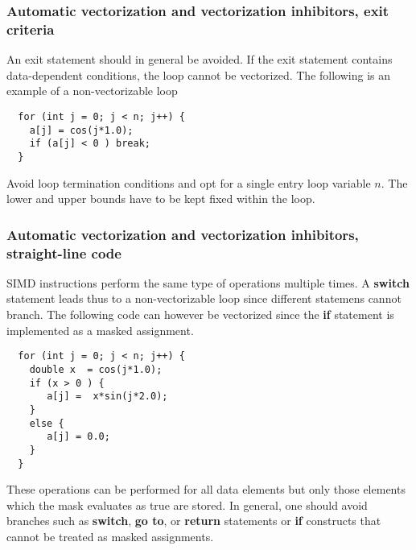 \documentclass{beamer}
\begin{document}
\begin{frame}
\frametitle{Automatic vectorization and vectorization inhibitors, exit criteria}

An exit statement should in general be avoided. 
If the exit statement contains data-dependent conditions, the loop cannot be vectorized. 
The following is an example of a non-vectorizable loop





\begin{verbatim}
  for (int j = 0; j < n; j++) {
    a[j] = cos(j*1.0);
    if (a[j] < 0 ) break;
  }

\end{verbatim}

Avoid loop termination conditions and opt for a single entry loop variable $n$. The lower and upper bounds have to be kept fixed within the loop.
\end{frame}

\begin{frame}
\frametitle{Automatic vectorization and vectorization inhibitors, straight-line code}

SIMD instructions perform the same type of operations multiple times. 
A \textbf{switch} statement leads thus to a non-vectorizable loop since different statemens cannot branch.
The following code can however be vectorized since the \textbf{if} statement is implemented as a masked assignment.










\begin{verbatim}
  for (int j = 0; j < n; j++) {
    double x  = cos(j*1.0);
    if (x > 0 ) {
       a[j] =  x*sin(j*2.0); 
    }
    else {
       a[j] = 0.0;
    }
  }

\end{verbatim}

These operations can be performed for all data elements but only those elements which the mask evaluates as true are stored. In general, one should avoid branches such as \textbf{switch}, \textbf{go to}, or \textbf{return} statements or \textbf{if} constructs that cannot be treated as masked assignments.
\end{frame}
\end{document}
